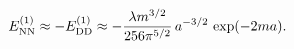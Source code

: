 \begin{equation}
E_{\rm NN}^{(1)}\approx -E_{\rm DD}^{(1)}
\approx -\frac{\lambda m^{3/2}}{256\pi^{5/2}}\,a^{-3/2}\,\exp(-2ma).
\end{equation}

